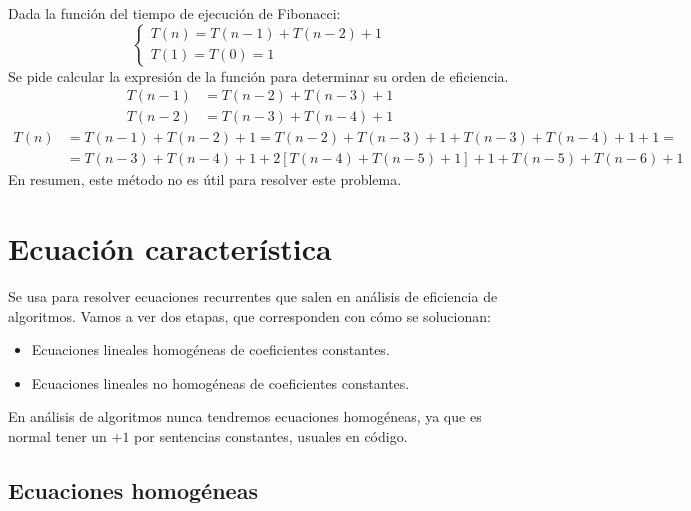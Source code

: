 \begin{ejemplo}[Fibonacci]\label{ej_fibonacci}
Dada la función del tiempo de ejecución de Fibonacci:
\begin{equation*}
    \left\{\begin{array}{l}
        T(n) = T(n-1)+T(n-2)+1 \\
        T(1) = T(0) = 1
    \end{array}\right.
\end{equation*}
Se pide calcular la expresión de la función para determinar su orden de eficiencia.
\begin{align*}
    T(n-1) &= T(n-2) + T(n-3) + 1\\
    T(n-2) &= T(n-3) +T(n-4)+1
\end{align*}
\begin{align*}
T(n) &= T(n-1)+T(n-2)+1 = T(n-2)+T(n-3)+1+T(n-3)+T(n-4)+1+1=\\
     &= T(n-3)+T(n-4)+1+2[T(n-4)+T(n-5)+1] + 1+T(n-5)+T(n-6)+1
\end{align*}
En resumen, este método no es útil para resolver este problema.
\end{ejemplo}

\section{Ecuación característica}
Se usa para resolver ecuaciones recurrentes que salen en análisis de eficiencia de algoritmos.
Vamos a ver dos etapas, que corresponden con cómo se solucionan:
\begin{itemize}
\item Ecuaciones lineales homogéneas de coeficientes constantes.
\item Ecuaciones lineales no homogéneas de coeficientes constantes.
\end{itemize}
  
En análisis de algoritmos nunca tendremos ecuaciones homogéneas, ya que es normal tener un $+1$ por sentencias constantes, usuales en código.

\subsection{Ecuaciones homogéneas}

